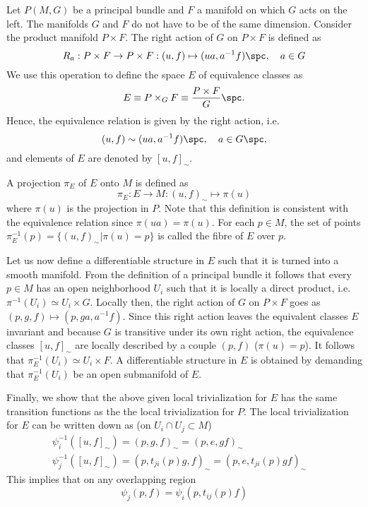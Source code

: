 \documentclass[10pt,reqno]{amsart}
\numberwithin{equation}{section}
\begin{document}
Let $P(M,G)$ be a principal bundle and $F$ a manifold on which 
$G$ acts on the left. The manifolds $G$ and $F$ do not have to be 
of the same dimension. Consider the product manifold $P \times 
F$. The right action of $G$ on $P \times F$ is defined as
%
\begin{equation}
	R_a : P \times F \rightarrow P \times F : (u,f) \mapsto 
	(ua,a^{-1}f) \spc, \quad a \in G
\end{equation}
We use this operation to define the space $E$ of equivalence 
classes as
%
\begin{equation}
	E \equiv P \times_G F \equiv \frac{P \times F}{G}\spc.
\end{equation}
Hence, the equivalence relation is given by the right action, 
i.e.\
%
\begin{displaymath}
	(u,f) \sim (ua,a^{-1}f)\spc, \quad a \in G\spc,
\end{displaymath}
and elements of $E$ are denoted by $[u,f]_\sim$.

A projection $\pi_E$ of $E$ onto $M$ is defined as
%
\begin{equation}
	\pi_E : E \rightarrow M : (u,f)_\sim \mapsto \pi(u)
\end{equation}
where $\pi(u)$ is the projection in $P$. Note that this 
definition is consistent with the equivalence relation since 
$\pi(ua) = \pi(u)$. For each $p \in M$, the set of points 
$\pi^{-1}_E(p) = \{(u,f)_\sim | \pi(u) = p\}$ is called the fibre 
of $E$ over $p$.

Let us now define a differentiable structure in $E$ such that it 
is turned into a smooth manifold. From the definition of a 
principal bundle it follows that every $p \in M$ has an open 
neighborhood $U_i$ such that it is locally a direct product, 
i.e.\ $\pi^{-1}(U_i) \simeq U_i \times G$. Locally then, the 
right action of $G$ on $P \times F$ goes as $(p,g,f) \mapsto 
(p,ga,a^{-1}f)$. Since this right action leaves the equivalent 
classes $E$ invariant and because $G$ is transitive under its own 
right action, the equivalence classes $[u,f]_\sim$ are locally 
described by a couple $(p,f)$ ($\pi(u)=p$). It follows that 
$\pi^{-1}_E(U_i) \simeq U_i \times F$. A differentiable structure 
in $E$ is obtained by demanding that $\pi^{-1}_E(U_i)$ be an open 
submanifold of $E$. 

Finally, we show that the above given local trivialization for 
$E$ has the same transition functions as the the local 
trivialization for $P$. The local trivialization for $E$ can be 
written down as (on $U_i \cap U_j \subset M$)
%
\begin{gather*}
	\psi_i^{-1}([u,f]_\sim) = (p,g,f)_\sim = (p,e,gf)_\sim \\
	\psi_j^{-1}([u,f]_\sim) = (p,t_{ji}(p)g,f)_\sim = 
	(p,e,t_{ji}(p)gf)_\sim \quad
\end{gather*}
This implies that on any overlapping region
%
\begin{equation}
	\psi_j(p,f) = \psi_i(p,t_{ij}(p)f)
\end{equation}
\end{document}
